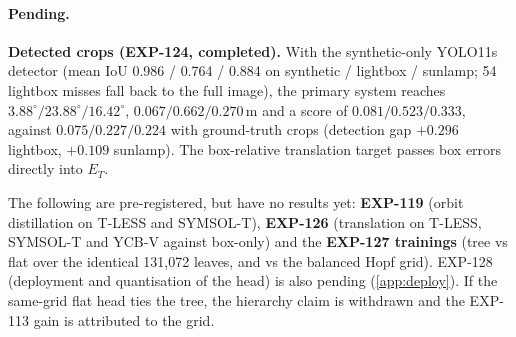 \paragraph{Pending.}
\textbf{Detected crops (EXP-124, completed).} With the synthetic-only YOLO11s detector (mean IoU 0.986 / 0.764 / 0.884 on synthetic / lightbox / sunlamp; 54 lightbox misses fall back to the full image), the primary system reaches $3.88^\circ/23.88^\circ/16.42^\circ$, $0.067/0.662/0.270$\,m and a score of $0.081/0.523/0.333$, against $0.075/0.227/0.224$ with ground-truth crops (detection gap $+0.296$ lightbox, $+0.109$ sunlamp). The box-relative translation target passes box errors directly into $E_T$.

The following are pre-registered, but have no results yet: \textbf{EXP-119} (orbit distillation on T-LESS and SYMSOL-T), \textbf{EXP-126} (translation on T-LESS, SYMSOL-T and YCB-V against box-only) and the \textbf{EXP-127 trainings} (tree vs flat over the identical 131,072 leaves, and vs the balanced Hopf grid). EXP-128 (deployment and quantisation of the head) is also pending (\cref{app:deploy}). If the same-grid flat head ties the tree, the hierarchy claim is withdrawn and the EXP-113 gain is attributed to the grid.

